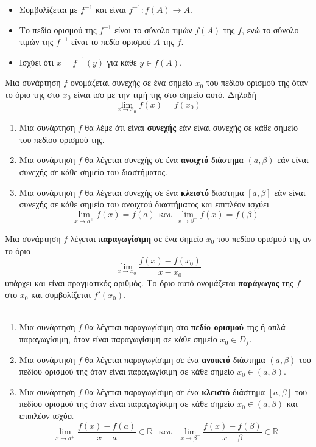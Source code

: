 \documentclass[ektypwsh]{frontisthrio}
\begin{document}
\begin{itemize}[itemsep=0mm]
\item Συμβολίζεται με $ f^{-1} $ και είναι $ f^{-1}:f(A)\to A $.
\item Το πεδίο ορισμού της $ f^{-1} $ είναι το σύνολο τιμών $ f(A) $ της $ f $, ενώ το σύνολο τιμών της $ f^{-1} $ είναι το πεδίο ορισμού $ A $ της $ f $.
\item Ισχύει ότι $ x=f^{-1}(y) $ για κάθε $ y\in f(A) $.
\end{itemize}
Μια συνάρτηση $ f $ ονομάζεται συνεχής σε ένα σημείο $ x_0 $ του πεδίου ορισμού της όταν το όριο της στο $ x_0 $ είναι ίσο με την τιμή της στο σημείο αυτό. Δηλαδή \[ \lim_{x\rightarrow x_0}{f(x)}=f(x_0) \]
\begin{enumerate}
\item Μια συνάρτηση $ f $ θα λέμε ότι είναι \textbf{συνεχής} εάν είναι συνεχής σε κάθε σημείο του πεδίου ορισμού της.
\item Μια συνάρτηση $ f $ θα λέγεται συνεχής σε ένα \textbf{ανοιχτό} διάστημα $ (a,\beta) $ εάν είναι συνεχής σε κάθε σημείο του διαστήματος.
\item Μια συνάρτηση $ f $ θα λέγεται συνεχής σε ένα \textbf{κλειστό} διάστημα $ [a,\beta] $ εάν είναι συνεχής σε κάθε σημείο του ανοιχτού διαστήματος και επιπλέον ισχύει
\[ \lim_{x\to a^+}{f(x)}=f(a)\ \ \textrm{και}\ \ \lim_{x\to\beta^-}{f(x)}=f(\beta) \]
\end{enumerate}
Μια συνάρτηση $ f $ λέγεται \textbf{παραγωγίσιμη} σε ένα σημείο $ x_0 $ του πεδίου ορισμού της αν το όριο
\[ \lim_{x\rightarrow x_0}{\frac{f(x)-f(x_0)}{x-x_0}} \]
υπάρχει και είναι πραγματικός αριθμός. Το όριο αυτό ονομάζεται \textbf{παράγωγος} της $ f $ στο $ x_0 $ και συμβολίζεται $ f'(x_0) $.\\\\
\vspace{-7mm}
\begin{enumerate}
\item Μια συνάρτηση $ f $ θα λέγεται παραγωγίσιμη στο \textbf{πεδίο ορισμού} της ή απλά παραγωγίσιμη, όταν είναι παραγωγίσιμη σε κάθε σημείο $ x_0\in D_f $.
\item Μια συνάρτηση $ f $ θα λέγεται παραγωγίσιμη σε ένα \textbf{ανοικτό} διάστημα $ (a,\beta) $ του πεδίου ορισμού της όταν είναι παραγωγίσιμη σε κάθε σημείο $ x_0\in(a,\beta) $.
\item Μια συνάρτηση $ f $ θα λέγεται παραγωγίσιμη σε ένα \textbf{κλειστό} διάστημα $ [a,\beta] $ του πεδίου ορισμού της όταν είναι παραγωγίσιμη σε κάθε σημείο $ x_0\in(a,\beta) $ και επιπλέον ισχύει
\[ \lim_{x\to a^+}{\frac{f(x)-f(a)}{x-a}}\in\mathbb{R}\ \ \textrm{ και }\ \ \lim_{x\to \beta^-}{\frac{f(x)-f(\beta)}{x-\beta}}\in\mathbb{R} \]
\end{enumerate}
\end{document}
